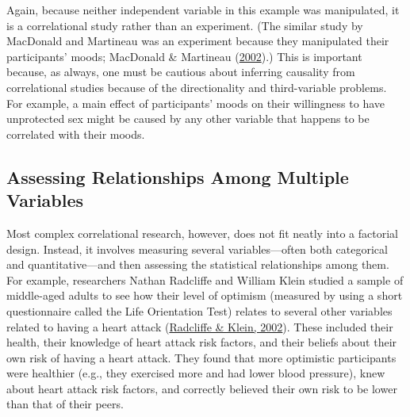 \documentclass[
]{krantz}
\begin{document}
Again, because neither independent variable in this example was manipulated, it is a correlational study rather than an experiment. (The similar study by MacDonald and Martineau was an experiment because they manipulated their participants' moods; MacDonald \& Martineau (\protect\hyperlink{ref-macdonald2002self}{2002}).) This is important because, as always, one must be cautious about inferring causality from correlational studies because of the directionality and third-variable problems. For example, a main effect of participants' moods on their willingness to have unprotected sex might be caused by any other variable that happens to be correlated with their moods.

\hypertarget{assessing-relationships-among-multiple-variables}{%
\subsection*{Assessing Relationships Among Multiple Variables}\label{assessing-relationships-among-multiple-variables}}


Most complex correlational research, however, does not fit neatly into a factorial design. Instead, it involves measuring several variables---often both categorical and quantitative---and then assessing the statistical relationships among them. For example, researchers Nathan Radcliffe and William Klein studied a sample of middle-aged adults to see how their level of optimism (measured by using a short questionnaire called the Life Orientation Test) relates to several other variables related to having a heart attack (\protect\hyperlink{ref-radcliffe2002dispositional}{Radcliffe \& Klein, 2002}). These included their health, their knowledge of heart attack risk factors, and their beliefs about their own risk of having a heart attack. They found that more optimistic participants were healthier (e.g., they exercised more and had lower blood pressure), knew about heart attack risk factors, and correctly believed their own risk to be lower than that of their peers.
\end{document}
